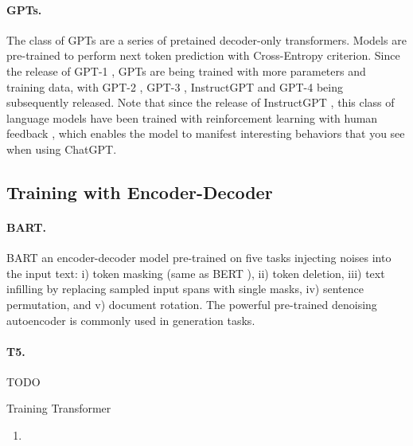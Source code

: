 \paragraph{GPTs.} The class of GPTs are a series of pretained decoder-only transformers. Models are pre-trained to perform next token prediction with Cross-Entropy criterion. Since the release of GPT-1 \citep{gpt-1}, GPTs are being trained with more parameters and training data, with GPT-2 \citep{gpt-2}, GPT-3 
\citep{gpt-3}, InstructGPT \citep{instructgpt} and GPT-4 \citep{gpt-4} being subsequently released. Note that since the release of InstructGPT \citep{instructgpt}, this class of language models have been trained with reinforcement learning with human feedback \citep{rlhf}, which enables the model to manifest interesting behaviors that you see when using ChatGPT.
\subsection{Training with Encoder-Decoder}
\paragraph{BART.} BART \cite{lewis-etal-2020-bart} an encoder-decoder model pre-trained on five tasks injecting noises into the input text: i) token masking (same as BERT \cite{devlin2018bert}), ii) token deletion, iii) text infilling by replacing sampled input spans with single masks, iv) sentence permutation, and v) document rotation. The powerful pre-trained denoising autoencoder is commonly used in generation tasks.
\paragraph{T5.} TODO


\begin{exercise}
Training Transformer
\begin{enumerate}
    \item 
\end{enumerate}

\end{exercise}
